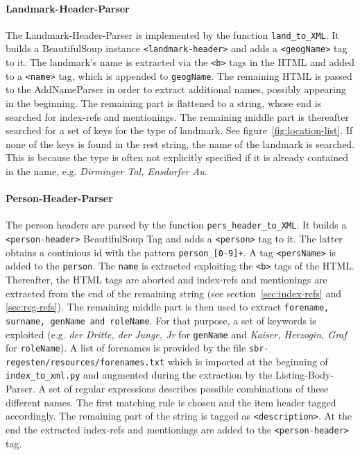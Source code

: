\paragraph{Landmark-Header-Parser}
The Landmark-Header-Parser is implemented by the function \texttt{land\_to\_XML}. It builds a BeautifulSoup instance \texttt{<landmark-header>} and adds a \texttt{<geogName>} tag to it. The landmark's name is extracted via the \texttt{<b>} tags in the HTML and added to a \texttt{<name>} tag, which is appended to \texttt{geogName}. The remaining HTML is passed to the AddNameParser in order to extract additional names, possibly appearing in the beginning. The remaining part is flattened to a string, whose end is searched for index-refs and mentionings. The remaining middle part is thereafter searched for a set of keys for the type of landmark. See figure~\ref{fig:location-list}. If none of the keys is found in the rest string, the name of the landmark is searched. This is because the type is often not explicitly specified if it is already contained in the name, e.g. \textit{Dirminger Tal, Ensdorfer Au}.

\paragraph{Person-Header-Parser}
The person headers are parsed by the function \texttt{pers\_header\_to\_XML}. It builds a \texttt{<person-header>} BeautifulSoup Tag and adds a \texttt{<person>} tag to it. The latter obtains a continious id with the pattern \texttt{person\_[0-9]+}. A tag \texttt{<persName>} is added to the \texttt{person}. The \texttt{name} is extracted exploiting the \texttt{<b>} tags of the HTML. Thereafter, the HTML tags are aborted and index-refs and mentionings are extracted from the end of the remaining string (see section~\ref{sec:index-refs} and \ref{sec:reg-refs}). The remaining middle part is then used to extract \texttt{forename, surname, genName and roleName}. For that purpose, a set of keywords is exploited (e.g. \textit{der Dritte, der Junge, Jr} for \texttt{genName} and \textit{Kaiser, Herzogin, Graf} for \texttt{roleName}). A list of forenames is provided by the file \texttt{sbr-regesten/resources/forenames.txt} which is imported at the beginning of \texttt{index\_to\_xml.py} and augmented during the extraction by the Listing-Body-Parser. A set of regular expressions describes possible combinations of these different names. The first matching rule is chosen and the item header tagged accordingly. The remaining part of the string is tagged as \texttt{<description>}. At the end the extracted index-refs and mentionings are added to the \texttt{<person-header>} tag.

